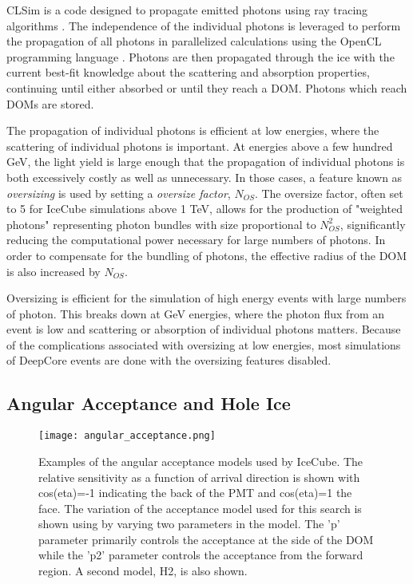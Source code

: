 CLSim is a code designed to propagate emitted photons using ray tracing algorithms \cite{PPC}.
The independence of the individual photons is leveraged to perform the propagation of all photons in parallelized calculations using the OpenCL programming language \cite{OpenCL}.
Photons are then propagated through the ice with the current best-fit knowledge about the scattering and absorption properties, continuing until either absorbed or until they reach a DOM.
Photons which reach DOMs are stored.

The propagation of individual photons is efficient at low energies, where the scattering of individual photons is important.
At energies above a few hundred GeV, the light yield is large enough that the propagation of individual photons is both excessively costly as well as unnecessary.
In those cases, a feature known as \emph{oversizing} is used by setting a \emph{oversize factor}, $N_{OS}$.
The oversize factor, often set to 5 for IceCube simulations above 1 TeV, allows for the production of "weighted photons" representing photon bundles with size proportional to $N^2_{OS}$, significantly reducing the computational power necessary for large numbers of photons.
In order to compensate for the bundling of photons, the effective radius of the DOM is also increased by $N_{OS}$.

Oversizing is efficient for the simulation of high energy events with large numbers of photon.
This breaks down at GeV energies, where the photon flux from an event is low and scattering or absorption of individual photons matters.
Because of the complications associated with oversizing at low energies, most simulations of DeepCore events are done with the oversizing features disabled.

\subsection{Angular Acceptance and Hole Ice}
\label{subsec:holeice_sim}

\begin{figure}
\centering
\texttt{[image: angular\_acceptance.png]} 
\caption{Examples of the angular acceptance models used by IceCube. The relative sensitivity as a function of arrival direction is shown with cos(eta)=-1 indicating the back of the PMT and cos(eta)=1 the face. The variation of the acceptance model used for this search is shown using by varying two parameters in the model. The 'p' parameter primarily controls the acceptance at the side of the DOM while the 'p2' parameter controls the acceptance from the forward region. A second model, H2, is also shown.}
\label{fig:angular_acceptance}
\end{figure}

